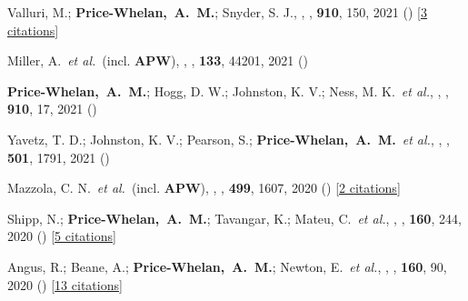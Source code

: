 \item[{\color{deemph}\scriptsize73}]Valluri, M.; \textbf{Price-Whelan,~A.~M.}; Snyder, S. J., , \apj, \textbf{910}, 150, 2021 () [\href{http://adsabs.harvard.edu/abs/2021ApJ...910..150V}{3 citations}]

\item[{\color{deemph}\scriptsize72}]Miller, A.~\textit{et al.}~(incl. \textbf{APW}), , \pasp, \textbf{133}, 44201, 2021 ()

\item[{\color{deemph}\scriptsize71}]\textbf{Price-Whelan,~A.~M.}; Hogg, D. W.; Johnston, K. V.; Ness, M. K.~\textit{et al.}, , \apj, \textbf{910}, 17, 2021 ()

\item[{\color{deemph}\scriptsize70}]Yavetz, T. D.; Johnston, K. V.; Pearson, S.; \textbf{Price-Whelan,~A.~M.}~\textit{et al.}, , \mnras, \textbf{501}, 1791, 2021 ()

\item[{\color{deemph}\scriptsize69}]Mazzola, C. N.~\textit{et al.}~(incl. \textbf{APW}), , \mnras, \textbf{499}, 1607, 2020 () [\href{http://adsabs.harvard.edu/abs/2020MNRAS.499.1607M}{2 citations}]

\item[{\color{deemph}\scriptsize68}]Shipp, N.; \textbf{Price-Whelan,~A.~M.}; Tavangar, K.; Mateu, C.~\textit{et al.}, , \aj, \textbf{160}, 244, 2020 () [\href{http://adsabs.harvard.edu/abs/2020AJ....160..244S}{5 citations}]

\item[{\color{deemph}\scriptsize67}]Angus, R.; Beane, A.; \textbf{Price-Whelan,~A.~M.}; Newton, E.~\textit{et al.}, , \aj, \textbf{160}, 90, 2020 () [\href{http://adsabs.harvard.edu/abs/2020AJ....160...90A}{13 citations}]

